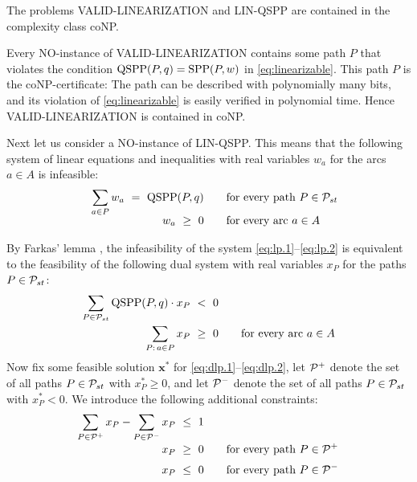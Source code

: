 \begin{lemma}
\label{le:coNP}
The problems VALID-LINEARIZATION and LIN-QSPP are contained in the complexity class coNP.
\end{lemma}
\proof
Every NO-instance of VALID-LINEARIZATION contains some path $P$ that violates the condition
$\text{QSPP}(P,q)=\text{SPP}(P,w)$ in \eqref{eq:linearizable}.
This path $P$ is the coNP-certificate: The path can be described with polynomially many bits,
and its violation of \eqref{eq:linearizable} is easily verified in polynomial time.
Hence VALID-LINEARIZATION is contained in coNP.

Next let us consider a NO-instance of LIN-QSPP.
This means that the following system of linear equations and inequalities with real 
variables $w_a$ for the arcs $a\in A$ is infeasible:
\begin{align}
\sum_{a\in P} w_a~=~\qspp(P,q) &\qquad\text{for every path $P\in\ppp$} \label{eq:lp.1} \\[-1.2ex]
              w_a~\ge~0        &\qquad\text{for every arc $a\in A$}    \label{eq:lp.2} \\[-2.5ex]
\hphantom{\sum_{P\in\ppp} \qspp(P,q)\cdot x_P~<~0} &&                  \nonumber
\end{align}
By Farkas' lemma \cite{Farkas1902}, the infeasibility of the system \eqref{eq:lp.1}--\eqref{eq:lp.2}
is equivalent to the feasibility of the following dual system with real variables $x_P$ for the
paths $P\in{\cal P}_{st}$:
\begin{align}
\sum_{P\in{\cal P}_{st}} \text{QSPP}(P,q)\cdot x_P ~<~0 &                                    \label{eq:dlp.1} \\[-0.2ex]
\sum_{P:\,a\in P} x_P             ~\ge~0 &\qquad\text{for every arc $a\in A$} \label{eq:dlp.2} 
\end{align}
Now fix some feasible solution $\pmb x^*$ for \eqref{eq:dlp.1}--\eqref{eq:dlp.2},
let ${\cal P}^+$ denote the set of all paths $P\in{\cal P}_{st}$ with $x^*_P\ge0$, and 
let ${\cal P}^-$ denote the set of all paths $P\in{\cal P}_{st}$ with $x^*_P<0$.
We introduce the following additional constraints:
\begin{align}
\sum_{P\in\pppx}x_P - \sum_{P\in\pppy}x_P  ~\le~1  &                 \label{eq:dlp.3} \\[-0.5ex]
                x_P  ~\ge~0 &\qquad\text{for every path $P\in\pppx$} \label{eq:dlp.4} \\[0.5ex]
                x_P  ~\le~0 &\qquad\text{for every path $P\in\pppy$} \label{eq:dlp.5} \\[-2.5ex] 
\hphantom{\sum_{P\in\ppp} \qspp(P,q)\cdot x_P~<~0} &&                \nonumber
\end{align}
